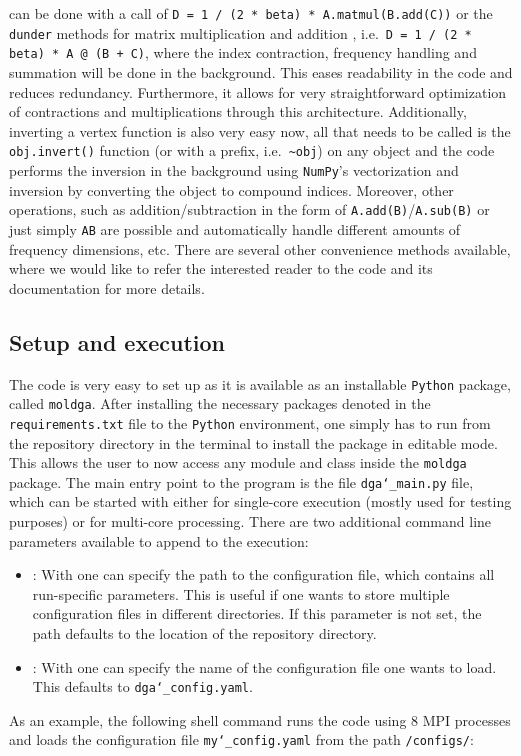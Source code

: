 \documentclass[../../main.tex]{subfiles}
\begin{document}
can be done with a call of \texttt{D = 1 / (2 * beta) * A.matmul(B.add(C))} or the \texttt{dunder} methods for matrix multiplication  and addition \say{\texttt{+}}, i.e.\ \texttt{D = 1 / (2 * beta) * A @ (B + C)}, where the index contraction, frequency handling and summation will be done in the background. This eases readability in the code and reduces redundancy. Furthermore, it allows for very straightforward optimization of contractions and multiplications through this architecture. Additionally, inverting a vertex function is also very easy now, all that needs to be called is the \texttt{obj.invert()} function (or with a \say{\sim} prefix, i.e.\ \texttt{\sim obj}) on any object and the code performs the inversion in the background using \texttt{NumPy}'s vectorization and inversion by converting the object to compound indices. Moreover, other operations, such as addition/subtraction in the form of \texttt{A.add(B)}/\texttt{A.sub(B)} or just simply \texttt{A\pm B} are possible and automatically handle different amounts of frequency dimensions, etc. There are several other convenience methods available, where we would like to refer the interested reader to the code and its documentation for more details.

\subsection{Setup and execution}

The code is very easy to set up as it is available as an installable \texttt{Python} package, called \texttt{moldga}. After installing the necessary packages denoted in the \texttt{requirements.txt} file to the \texttt{Python} environment, one simply has to run  from the repository directory in the terminal to install the package in editable mode. This allows the user to now access any module and class inside the \texttt{moldga} package. The main entry point to the program is the file \texttt{dga\char`_main.py} file, which can be started with either  for single-core execution (mostly used for testing purposes) or \mbox{} for multi-core processing. There are two additional command line parameters available to append to the execution:
\begin{itemize}
\item{}: With  one can specify the path to the configuration file, which contains all run-specific parameters. This is useful if one wants to store multiple configuration files in different directories. If this parameter is not set, the path defaults to the location of the repository directory.
\item{}: With  one can specify the name of the configuration file one wants to load. This defaults to \texttt{dga\char`_config.yaml}.
\end{itemize}
As an example, the following shell command runs the code using 8 MPI processes and loads the configuration file \texttt{my\char`_config.yaml} from the path \texttt{/configs/}:
\end{document}
